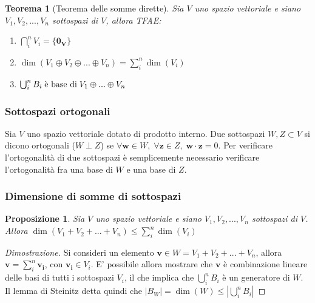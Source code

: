 \documentclass{article}
\newtheorem{theorem}{Teorema}
\newtheorem{proposition}{Proposizione}
\begin{document}
    \vspace{10pt}
    \begin{theorem}[Teorema delle somme dirette]
        Sia $V$ uno spazio vettoriale e siano $V_1, V_2, ..., V_n$ sottospazi di $V$, allora TFAE: 
        \begin{enumerate}[label=\textnormal{(\arabic*)}]
            \item $\bigcap_{i}^{n} V_i = \{\mathbf{0_V}\}$ 
            \item $\dim(V_1 \oplus V_2 \oplus ... \oplus V_n) =  \sum_{i}^{n} \dim(V_i)$
            \item $\bigcup_{i}^{n} B_i \; \textnormal{è base di} \; V_1 \oplus ... \oplus V_n$
        \end{enumerate}
    \end{theorem}

    \vspace{10pt}
    \subsubsection{Sottospazi ortogonali}
    Sia $V$ uno spazio vettoriale dotato di prodotto interno. Due sottospazi $W, Z \subset V$ si dicono ortogonali ($W \perp Z$) se $\forall \mathbf{w} \in W, \; \forall \mathbf{z} \in Z, \; \mathbf{w} \cdot \mathbf{z} = 0$.
    Per verificare l'ortogonalità di due sottospazi è semplicemente necessario verificare l'ortogonalità fra una base di $W$ e una base di $Z$.

    \vspace{10pt}
    \subsubsection{Dimensione di somme di sottospazi}
    \begin{proposition}
        Sia $V$ uno spazio vettoriale e siano $V_1, V_2, ..., V_n$ sottospazi di $V$. Allora $\dim(V_1 + V_2 + ... + V_n) \leq \displaystyle \sum_{i}^{n} \dim(V_i)$
    \end{proposition}

    \begin{proof}[Dimostrazione]
        Si consideri un elemento $\mathbf{v} \in W = V_1 + V_2 + ... + V_n$, allora $\mathbf{v} = \displaystyle \sum_{i}^{n} \mathbf{v_i}$, con $\mathbf{v_i} \in V_i$. 
        E' possibile allora mostrare che $\mathbf{v}$ è combinazione lineare delle basi di tutti i sottospazi $V_i$, il che implica che $\displaystyle \bigcup_{i}^{n} B_i$ è un generatore di $W$. Il lemma di Steinitz detta quindi che $|B_W| = \dim(W) \leq |\displaystyle \bigcup_{i}^{n} B_i|$
    \end{proof}
\end{document}
